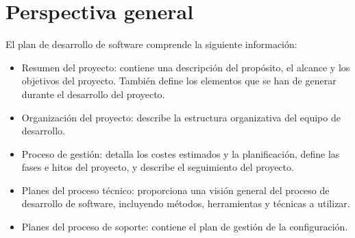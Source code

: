 \section{Perspectiva general}
El plan de desarrollo de software comprende la siguiente información:
\begin{itemize}
\item	Resumen del proyecto: contiene una descripción del propósito, el alcance y los objetivos del proyecto. También define los elementos que se han de generar durante el desarrollo del proyecto.
\item	Organización del proyecto: describe la estructura organizativa del equipo de desarrollo.
\item	Proceso de gestión: detalla los costes estimados y la planificación, define las fases e hitos del proyecto, y describe el seguimiento del proyecto.
\item	Planes del proceso técnico: proporciona una visión general del proceso de desarrollo de software, incluyendo métodos, herramientas y técnicas a utilizar.
\item	Planes del proceso de soporte: contiene el plan de gestión de la configuración.

\end{itemize}
